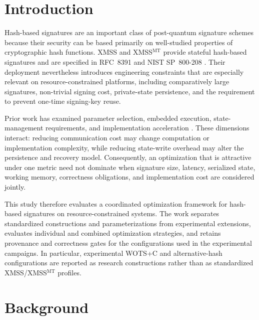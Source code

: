 \documentclass[pdflatex,sn-mathphys-num]{sn-jnl}
\begin{document}
\maketitle

\section{Introduction}
\label{sec:introduction}

Hash-based signatures are an important class of post-quantum
signature schemes because their security can be based primarily on
well-studied properties of cryptographic hash functions. XMSS and
XMSS$^{\mathrm{MT}}$ provide stateful hash-based signatures and are
specified in RFC~8391 and NIST SP~800-208
\cite{RFC8391,NIST800208}. Their deployment nevertheless introduces
engineering constraints that are especially relevant on
resource-constrained platforms, including comparatively large
signatures, non-trivial signing cost, private-state persistence, and
the requirement to prevent one-time signing-key reuse.

Prior work has examined parameter selection, embedded execution,
state-management requirements, and implementation acceleration
\cite{OptimalParametersXMSSMT,McGrew2016StateManagement,
Wang2020XMSSEmbedded,Bos2021RapidXMSS}. These dimensions interact:
reducing communication cost may change computation or implementation
complexity, while reducing state-write overhead may alter the
persistence and recovery model. Consequently, an optimization that is
attractive under one metric need not dominate when signature size,
latency, serialized state, working memory, correctness obligations,
and implementation cost are considered jointly.

This study therefore evaluates a coordinated optimization framework
for hash-based signatures on resource-constrained systems. The work
separates standardized constructions and parameterizations from
experimental extensions, evaluates individual and combined
optimization strategies, and retains provenance and correctness gates
for the configurations used in the experimental campaigns. In
particular, experimental WOTS+C and alternative-hash configurations
are reported as research constructions rather than as standardized
XMSS/XMSS$^{\mathrm{MT}}$ profiles.

\section{Background}
\label{sec:background}
\end{document}

